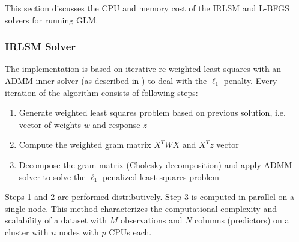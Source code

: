 This section discusses the CPU and memory cost of the IRLSM and L-BFGS solvers for running GLM.

\subsubsection{IRLSM Solver}

The implementation is based on iterative re-weighted least squares with an ADMM inner solver (as described
in ) to deal with the  $\ell_1$ penalty. Every iteration of the algorithm consists of following steps:

\begin{enumerate} 
\item Generate weighted least squares problem based on previous solution, i.e. vector of weights $w$ and response $z$ 
\item Compute the weighted gram matrix $X^TWX$ and $X^Tz$ vector
\item Decompose the gram matrix (Cholesky decomposition) and apply ADMM solver to solve the  $\ell_1$ penalized least squares problem
\end{enumerate}

Steps 1 and 2 are performed distributively. Step 3 is computed in parallel on a single node. This method
characterizes the computational complexity and scalability of a dataset with $M$ observations and $N$ columns (predictors) on a cluster with $n$ nodes with $p$ CPUs each.

\bigskip

